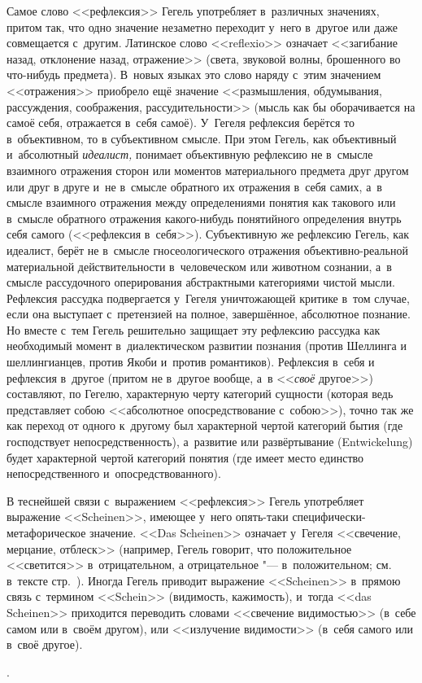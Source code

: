 {Самое слово <<рефлексия>> Гегель употребляет в~различных значениях, притом
так, что одно значение незаметно переходит у~него в~другое или даже
совмещается с~другим. Латинское слово <<reflexio>> означает <<загибание назад,
отклонение назад, отражение>> (света, звуковой волны, брошенного во
что-нибудь предмета). В~новых языках это слово наряду с~этим значением
<<отражения>> приобрело ещё значение <<размышления, обдумывания, рассуждения,
соображения, рассудительности>> (мысль как бы оборачивается на самоё себя,
отражается в~себя самоё). У~Гегеля рефлексия берётся то в~объективном, то в
субъективном смысле. При этом Гегель, как объективный и~абсолютный
{\em идеалист,} понимает объективную рефлексию не в~смысле взаимного
отражения сторон или моментов материального предмета друг другом или друг в
друге и~не в~смысле обратного их отражения в~себя самих, а~в смысле
взаимного отражения между определениями понятия как такового или в~смысле
обратного отражения какого-нибудь понятийного определения внутрь себя
самого (<<рефлексия в~себя>>). Субъективную же рефлексию Гегель, как
идеалист, берёт не в~смысле гносеологического отражения объективно-реальной
материальной действительности в~человеческом или животном сознании, а~в
смысле рассудочного оперирования абстрактными категориями чистой мысли.
Рефлексия рассудка подвергается у~Гегеля уничтожающей критике в~том случае,
если она выступает с~претензией на полное, завершённое, абсолютное
познание. Но вместе с~тем Гегель решительно защищает эту рефлексию рассудка
как необходимый момент в~диалектическом развитии познания (против Шеллинга
и шеллингианцев, против Якоби и~против романтиков). Рефлексия в~себя и
рефлексия в~другое (притом не в~другое вообще, а~в <<{\em своё} другое>>)
составляют, по Гегелю, характерную черту категорий сущности (которая ведь
представляет собою <<абсолютное опосредствование с~собою>>), точно так же как
переход от одного к~другому был характерной чертой категорий бытия (где
господствует непосредственность), а~развитие или развёртывание
(Ent\-wicke\-lung) будет характерной чертой категорий понятия (где имеет место
единство непосредственного и~опосредствованного).

В теснейшей связи с~выражением <<рефлексия>> Гегель употребляет выражение
<<Scheinen>>, имеющее у~него опять-таки специфически-метафорическое значение.
<<Das Scheinen>> означает у~Гегеля <<свечение, мерцание, отблеск>> (например,
Гегель говорит, что положительное <<светится>> в~отрицательном, а
отрицательное "--- в~положительном; см. в~тексте стр.~\pageref{scheinen}).
Иногда Гегель приводит выражение <<Scheinen>> в~прямою связь с~термином
<<Schein>> (видимость, кажимость), и~тогда <<das Scheinen>> приходится
переводить словами <<свечение видимостью>> (в~себе самом или в~своём другом),
или <<излучение видимости>> (в~себя самого или в~своё другое).}.
